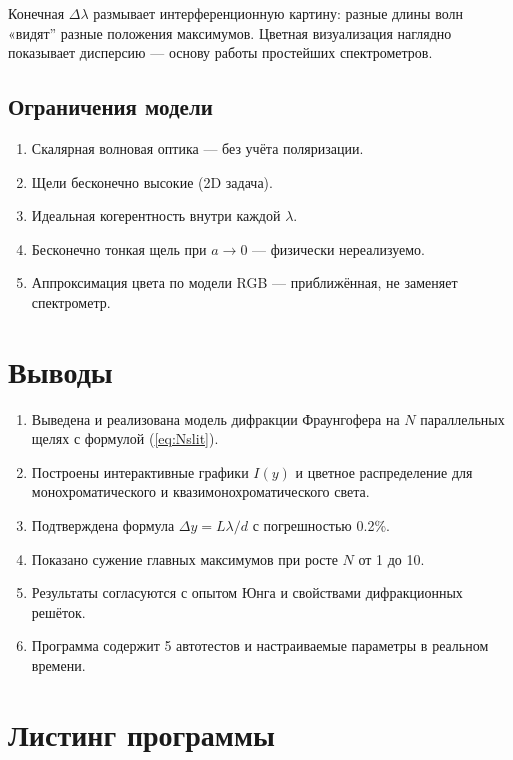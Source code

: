 \documentclass[12pt,a4paper]{article}
\begin{document}
Конечная \(\Delta\lambda\) размывает интерференционную картину: разные длины волн
«видят'' разные положения максимумов. Цветная визуализация наглядно показывает
дисперсию --- основу работы простейших спектрометров.

\subsection{Ограничения модели}

\begin{enumerate}
  \item Скалярная волновая оптика --- без учёта поляризации.
  \item Щели бесконечно высокие (2D задача).
  \item Идеальная когерентность внутри каждой \(\lambda\).
  \item Бесконечно тонкая щель при \(a\to0\) --- физически нереализуемо.
  \item Аппроксимация цвета по модели RGB --- приближённая, не заменяет спектрометр.
\end{enumerate}

\section{Выводы}

\begin{enumerate}
  \item Выведена и реализована модель дифракции Фраунгофера на \(N\) параллельных
        щелях с формулой (\ref{eq:Nslit}).
  \item Построены интерактивные графики \(I(y)\) и цветное распределение для
        монохроматического и квазимонохроматического света.
  \item Подтверждена формула \(\Delta y=L\lambda/d\) с погрешностью 0.2\%.
  \item Показано сужение главных максимумов при росте \(N\) от 1 до 10.
  \item Результаты согласуются с опытом Юнга и свойствами дифракционных решёток.
  \item Программа содержит 5 автотестов и настраиваемые параметры в реальном
        времени.
\end{enumerate}

\appendix
\section{Листинг программы}
\end{document}
